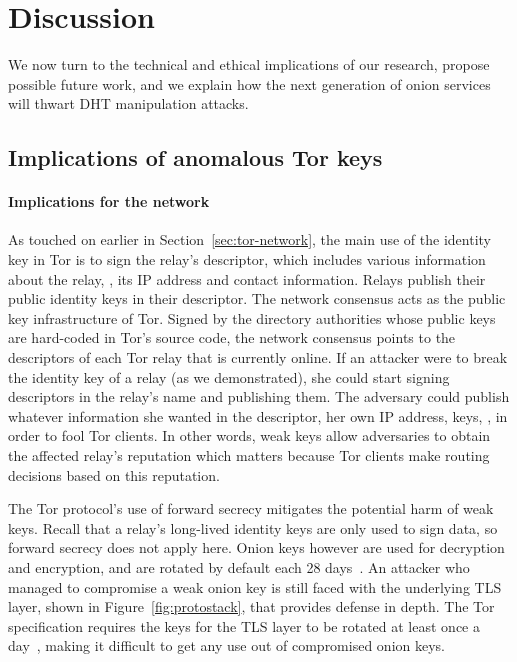\section{Discussion}
\label{sec:discussion}
We now turn to the technical and ethical implications of our research, propose
possible future work, and we explain how the next generation of onion
services will thwart DHT manipulation attacks.

\subsection{Implications of anomalous Tor keys}
\paragraph{Implications for the network}
As touched on earlier in Section~\ref{sec:tor-network}, the main use of the
identity key in Tor is to sign the relay's descriptor, which includes various
information about the relay, \eg, its IP address and contact information.
Relays publish their public identity keys in their descriptor.  The network
consensus acts as the public key infrastructure of Tor.  Signed by the directory
authorities whose public keys are hard-coded in Tor's source code, the network
consensus points to the descriptors of each Tor relay that is currently online.
If an attacker were to break the identity key of a relay (as we demonstrated),
she could start signing descriptors in the relay's name and publishing them. The
adversary could publish whatever information she wanted in the descriptor, \eg
her own IP address, keys, \etc, in order to fool Tor clients.  In other words,
weak keys allow adversaries to obtain the affected relay's reputation which
matters because Tor clients make routing decisions based on this reputation.

The Tor protocol's use of forward secrecy mitigates the potential harm of weak
keys.  Recall that a relay's long-lived identity keys are only used to sign
data, so forward secrecy does not apply here.  Onion keys however are used for
decryption and encryption, and are rotated by default each 28
days~\cite[\S~3.4.1]{dir-spec}.  An attacker who managed to compromise a weak
onion key is still faced with the underlying TLS layer, shown in
Figure~\ref{fig:protostack}, that provides defense in depth.  The Tor
specification requires the keys for the TLS layer to be rotated at least once a
day~\cite[\S~1.1]{torspec}, making it difficult to get any use out of
compromised onion keys.

